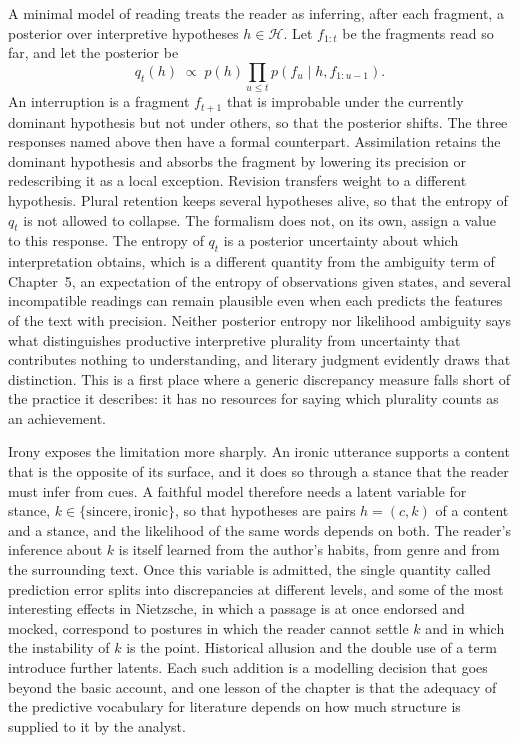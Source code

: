 A minimal model of reading treats the reader as inferring, after each fragment, a posterior over interpretive hypotheses $h\in\mathcal{H}$. Let $f_{1:t}$ be the fragments read so far, and let the posterior be
\[
q_t(h)\;\propto\; p(h)\prod_{u\le t}p(f_u\mid h,f_{1:u-1}).
\]
An interruption is a fragment $f_{t+1}$ that is improbable under the currently dominant hypothesis but not under others, so that the posterior shifts. The three responses named above then have a formal counterpart. Assimilation retains the dominant hypothesis and absorbs the fragment by lowering its precision or redescribing it as a local exception. Revision transfers weight to a different hypothesis. Plural retention keeps several hypotheses alive, so that the entropy of $q_t$ is not allowed to collapse. The formalism does not, on its own, assign a value to this response. The entropy of $q_t$ is a posterior uncertainty about which interpretation obtains, which is a different quantity from the ambiguity term of Chapter~5, an expectation of the entropy of observations given states, and several incompatible readings can remain plausible even when each predicts the features of the text with precision. Neither posterior entropy nor likelihood ambiguity says what distinguishes productive interpretive plurality from uncertainty that contributes nothing to understanding, and literary judgment evidently draws that distinction. This is a first place where a generic discrepancy measure falls short of the practice it describes: it has no resources for saying which plurality counts as an achievement.

Irony exposes the limitation more sharply. An ironic utterance supports a content that is the opposite of its surface, and it does so through a stance that the reader must infer from cues. A faithful model therefore needs a latent variable for stance, $k\in\{\text{sincere},\text{ironic}\}$, so that hypotheses are pairs $h=(c,k)$ of a content and a stance, and the likelihood of the same words depends on both. The reader's inference about $k$ is itself learned from the author's habits, from genre and from the surrounding text. Once this variable is admitted, the single quantity called prediction error splits into discrepancies at different levels, and some of the most interesting effects in Nietzsche, in which a passage is at once endorsed and mocked, correspond to postures in which the reader cannot settle $k$ and in which the instability of $k$ is the point. Historical allusion and the double use of a term introduce further latents. Each such addition is a modelling decision that goes beyond the basic account, and one lesson of the chapter is that the adequacy of the predictive vocabulary for literature depends on how much structure is supplied to it by the analyst.

